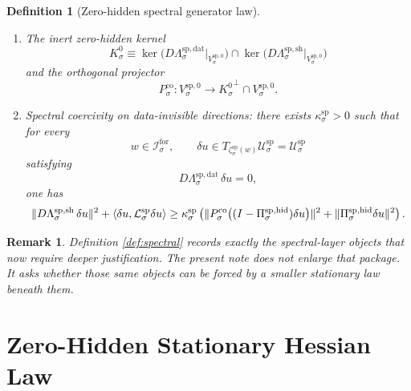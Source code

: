 \documentclass[11pt]{article}
\newcommand{\ForSpace}[1]{\mathcal I_{#1}^{\mathrm{for}}}
\newcommand{\Kernel}[1]{K_{#1}^{0}}
\newcommand{\StateComp}[1]{P_{#1}^{\mathrm{co}}}
\newcommand{\SpecSpace}[1]{\mathcal U_{#1}^{\mathrm{sp}}}
\newcommand{\SpecData}[1]{\Lambda_{#1}^{\mathrm{sp,dat}}}
\newcommand{\SpecShell}[1]{\Lambda_{#1}^{\mathrm{sp,sh}}}
\newcommand{\SpecOp}[1]{\mathcal L_{#1}^{\mathrm{sp}}}
\newcommand{\SpecZero}[1]{V_{#1}^{\mathrm{sp},0}}
\newcommand{\SpecProj}[1]{\Pi_{#1}^{\mathrm{sp,hid}}}
\newcommand{\SpecEmbed}[1]{\zeta_{#1}^{\mathrm{sp}}}
\newtheorem{definition}{Definition}
\newtheorem{remark}{Remark}
\begin{document}
\begin{definition}[Zero-hidden spectral generator law]
\begin{enumerate}
    \item The inert zero-hidden kernel
    \[
    \Kernel{\sigma}
    \equiv
    \ker\bigl(D\SpecData{\sigma}\big|_{\SpecZero{\sigma}}\bigr)
    \cap
    \ker\bigl(D\SpecShell{\sigma}\big|_{\SpecZero{\sigma}}\bigr)
    \]
    and the orthogonal projector
    \[
    \StateComp{\sigma}:
    \SpecZero{\sigma}\to
    {\Kernel{\sigma}}^{\perp}\cap\SpecZero{\sigma}.
    \]
    \item Spectral coercivity on data-invisible directions: there exists \(\kappa_{\sigma}^{\mathrm{sp}}>0\) such that for every
    \[
    w\in\ForSpace{\sigma},
    \qquad
    \delta u\in T_{\SpecEmbed{\sigma}(w)}\SpecSpace{\sigma}=\SpecSpace{\sigma}
    \]
    satisfying
    \[
    D\SpecData{\sigma}\,\delta u=0,
    \]
    one has
    \begin{equation}
    \|D\SpecShell{\sigma}\,\delta u\|^{2}
    +
    \ev{\delta u,\SpecOp{\sigma}\delta u}
    \ge
    \kappa_{\sigma}^{\mathrm{sp}}
    \left(
    \|\StateComp{\sigma}\bigl((I-\SpecProj{\sigma})\delta u\bigr)\|^{2}
    +
    \|\SpecProj{\sigma}\delta u\|^{2}
    \right).
    \label{eq:speccoercive}
    \end{equation}
\end{enumerate}
\end{definition}

\begin{remark}
Definition \ref{def:spectral} records exactly the spectral-layer objects that now require deeper justification. The present note does not enlarge that package. It asks whether those same objects can be forced by a smaller stationary law beneath them.
\end{remark}

\section{Zero-Hidden Stationary Hessian Law}
\end{document}
